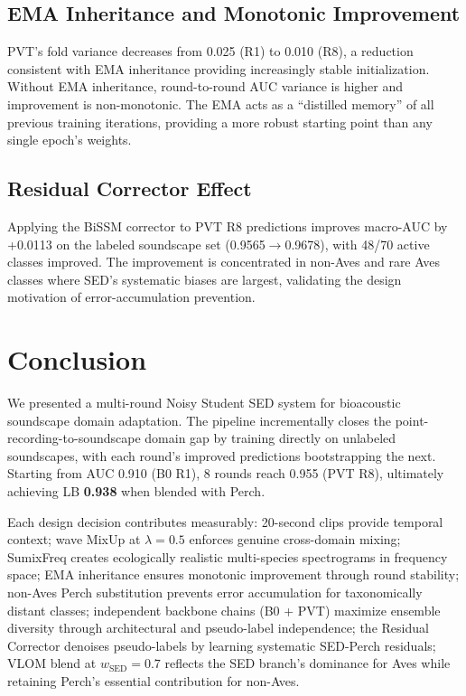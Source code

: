 \documentclass[journal]{IEEEtran}
\begin{document}
\subsection{EMA Inheritance and Monotonic Improvement}

PVT's fold variance decreases from 0.025 (R1) to 0.010 (R8), a reduction consistent with EMA inheritance providing increasingly stable initialization.
Without EMA inheritance, round-to-round AUC variance is higher and improvement is non-monotonic.
The EMA acts as a ``distilled memory'' of all previous training iterations, providing a more robust starting point than any single epoch's weights.

\subsection{Residual Corrector Effect}

Applying the BiSSM corrector to PVT R8 predictions improves macro-AUC by +0.0113 on the labeled soundscape set (0.9565$\to$0.9678), with 48/70 active classes improved.
The improvement is concentrated in non-Aves and rare Aves classes where SED's systematic biases are largest, validating the design motivation of error-accumulation prevention.

\section{Conclusion}

We presented a multi-round Noisy Student SED system for bioacoustic soundscape domain adaptation.
The pipeline incrementally closes the point-recording-to-soundscape domain gap by training directly on unlabeled soundscapes, with each round's improved predictions bootstrapping the next.
Starting from AUC 0.910 (B0 R1), 8 rounds reach 0.955 (PVT R8), ultimately achieving LB \textbf{0.938} when blended with Perch.

Each design decision contributes measurably:
20-second clips provide temporal context;
wave MixUp at $\lambda=0.5$ enforces genuine cross-domain mixing;
SumixFreq creates ecologically realistic multi-species spectrograms in frequency space;
EMA inheritance ensures monotonic improvement through round stability;
non-Aves Perch substitution prevents error accumulation for taxonomically distant classes;
independent backbone chains (B0 + PVT) maximize ensemble diversity through architectural and pseudo-label independence;
the Residual Corrector denoises pseudo-labels by learning systematic SED-Perch residuals;
VLOM blend at $w_\text{SED}=0.7$ reflects the SED branch's dominance for Aves while retaining Perch's essential contribution for non-Aves.
\end{document}
